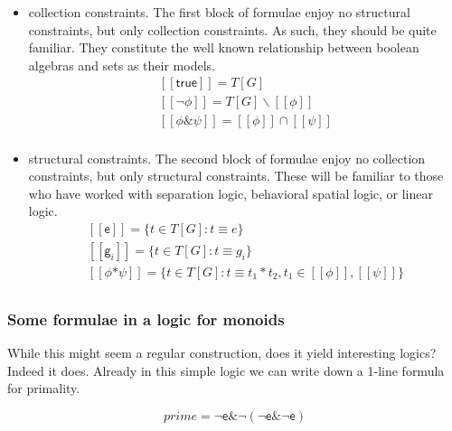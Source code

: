 \documentclass[]{acm_proc_article-sp}
\newcommand{\ldb}{[\![}
\newcommand{\rdb}{]\!]}
\newcommand{\scong}{\mathbin{\equiv}}
\newcommand{\meaningof}[1]{\ldb #1 \rdb}
\numberwithin{equation}{subsection}
\begin{document}
\begin{itemize}
\item collection constraints. The first block of formulae enjoy no
  structural constraints, but only collection constraints. As such,
  they should be quite familiar. They constitute the well known
  relationship between boolean algebras and sets as their models.
    \begin{equation*}
      \begin{aligned}
        \meaningof{\mathsf{true}} = T[G] \\
        \meaningof{\mathsf{\neg}\phi} = T[G] \backslash \meaningof{\phi} \\
        \meaningof{\phi \mathsf{\&} \psi} = \meaningof{\phi} \cap \meaningof{\psi} \\
      \end{aligned}
    \end{equation*}
  \item structural constraints. The second block of formulae enjoy no
    collection constraints, but only structural constraints. These
    will be familiar to those who have worked with separation logic,
    behavioral spatial logic, or linear logic.
    \begin{equation*}
      \begin{aligned}
        \meaningof{\mathsf{e}} = \{ t \in T[G] : t \scong e \} \\
        \meaningof{\mathsf{g}_i} = \{ t \in T[G] : t \scong g_i \}  \\
        \meaningof{\phi \mathsf{*} \psi} = \{ t \in T[G] : t \scong t_1 * t_2, t_1 \in \meaningof{\phi}, \meaningof{\psi} \} \\
      \end{aligned}
    \end{equation*}
\end{itemize}


\subsubsection{Some formulae in a logic for monoids}

While this might seem a regular construction, does it yield
interesting logics? Indeed it does. Already in this simple logic we
can write down a 1-line formula for primality.

\begin{equation*}
  prime = \mathsf{\neg}\mathsf{e} \mathsf{\&} \mathsf{\neg}(\mathsf{\neg}\mathsf{e} \mathsf{\&} \mathsf{\neg}\mathsf{e})
\end{equation*}
\end{document}
